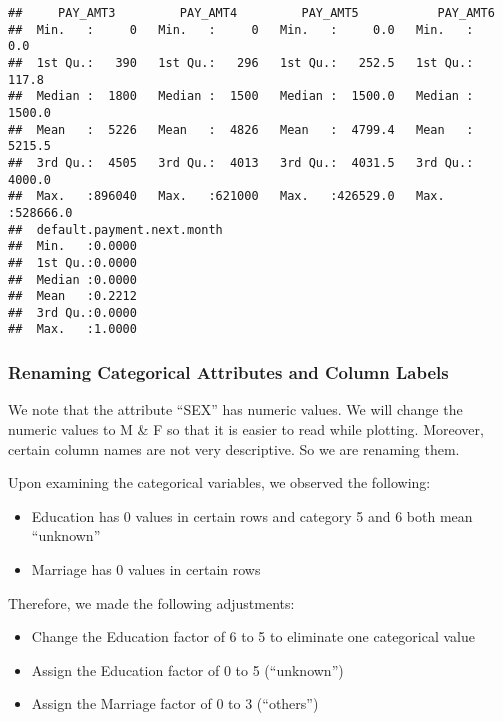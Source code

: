 \documentclass[]{article}
\providecommand{\tightlist}{%
  \setlength{\itemsep}{0pt}\setlength{\parskip}{0pt}}
\begin{document}
\begin{verbatim}
##     PAY_AMT3         PAY_AMT4         PAY_AMT5           PAY_AMT6       
##  Min.   :     0   Min.   :     0   Min.   :     0.0   Min.   :     0.0  
##  1st Qu.:   390   1st Qu.:   296   1st Qu.:   252.5   1st Qu.:   117.8  
##  Median :  1800   Median :  1500   Median :  1500.0   Median :  1500.0  
##  Mean   :  5226   Mean   :  4826   Mean   :  4799.4   Mean   :  5215.5  
##  3rd Qu.:  4505   3rd Qu.:  4013   3rd Qu.:  4031.5   3rd Qu.:  4000.0  
##  Max.   :896040   Max.   :621000   Max.   :426529.0   Max.   :528666.0  
##  default.payment.next.month
##  Min.   :0.0000            
##  1st Qu.:0.0000            
##  Median :0.0000            
##  Mean   :0.2212            
##  3rd Qu.:0.0000            
##  Max.   :1.0000
\end{verbatim}

\subsubsection{Renaming Categorical Attributes and Column
Labels}\label{renaming-categorical-attributes-and-column-labels}

We note that the attribute ``SEX'' has numeric values. We will change
the numeric values to M \& F so that it is easier to read while
plotting. Moreover, certain column names are not very descriptive. So we
are renaming them.

Upon examining the categorical variables, we observed the following:

\begin{itemize}
\tightlist
\item
  Education has 0 values in certain rows and category 5 and 6 both mean
  ``unknown''
\item
  Marriage has 0 values in certain rows
\end{itemize}

Therefore, we made the following adjustments:

\begin{itemize}
\tightlist
\item
  Change the Education factor of 6 to 5 to eliminate one categorical
  value
\item
  Assign the Education factor of 0 to 5 (``unknown'')
\item
  Assign the Marriage factor of 0 to 3 (``others'')
\end{itemize}
\end{document}
